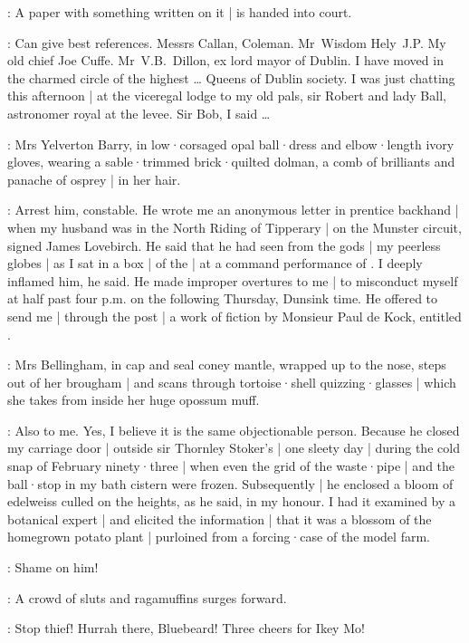 :
A paper with something written on it |
is handed into court.

\Bloom:
Can give best references.
Messrs Callan,
Coleman.
Mr~Wisdom Hely~J.P.
My old chief Joe Cuffe.
Mr~V.B.~Dillon,
ex lord mayor of Dublin.
I have moved in the charmed circle of the highest \ldots
Queens of Dublin society.
I was just chatting this afternoon |
at the viceregal lodge to my old pals,
sir Robert and lady Ball,
astronomer royal at the levee.
Sir Bob,
I said \ldots

:
Mrs Yelverton Barry,
in low·corsaged opal ball·dress and elbow·length ivory gloves,
wearing a sable·trimmed brick·quilted dolman,
a comb of brilliants and panache of osprey |
in her hair.

\Yelverton:
Arrest him,
constable.
He wrote me an anonymous letter in prentice backhand |
when my husband was in the North Riding of Tipperary |
on the Munster circuit,
signed James Lovebirch.
He said that he had seen from the gods |
my peerless globes |
as I sat in a box |
of the  |
at a command performance of .
I deeply inflamed him,
he said.
He made improper overtures to me |
to misconduct myself at half past four p.m.
on the following Thursday,
Dunsink time.
He offered to send me |
through the post |
a work of fiction by Monsieur Paul de Kock,
entitled .

:
Mrs Bellingham,
in cap and seal coney mantle,
wrapped up to the nose,
steps out of her brougham |
and scans through tortoise·shell quizzing·glasses |
which she takes from inside her huge opossum muff.

\Bellingham:
Also to me.
Yes,
I believe it is the same objectionable person.
Because he closed my carriage door |
outside sir Thornley Stoker's |
one sleety day |
during the cold snap of February ninety·three |
when even the grid of the waste·pipe |
and the ball·stop in my bath cistern were frozen.
Subsequently |
he enclosed a bloom of edelweiss culled on the heights,
as he said,
in my honour.
I had it examined by a botanical expert |
and elicited the information |
that it was a blossom of the homegrown potato plant |
purloined from a forcing·case of the model farm.

\Yelverton:
Shame on him!

:
A crowd of sluts and ragamuffins surges forward.

\Ragamuffins:
Stop thief!
Hurrah there,
Bluebeard!
Three cheers for Ikey Mo!

